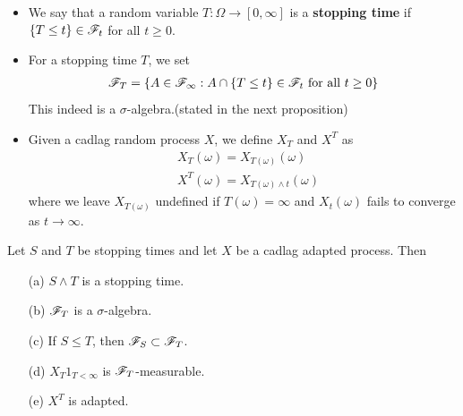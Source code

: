 \documentclass[12pt,a4paper]{report}
\begin{document}
\begin{itemize}
\item We say that a random variable $T : \Omega \rightarrow [0,\infty]$ is a \textbf{stopping time} if $\{T\leq t\} \in \mathscr{F}_t$ for all $t\geq 0$. 
\item For a stopping time $T$, we set
\begin{align*}
\mathscr{F}_T = \{A\in \mathscr{F}_{\infty} : A \cap \{T\leq t \} \in \mathscr{F}_t \text{ for all } t\geq 0 \}
\end{align*}
This indeed is a $\sigma$-algebra.(stated in the next proposition)
\item Given a cadlag random process $X$, we define $X_T$ and $X^T$ as
\begin{align*}
& X_T(\omega) = X_{T(\omega)} (\omega) \\
& X^T(\omega) = X_{T(\omega)\wedge t}(\omega)
\end{align*}
where we leave $X_{T(\omega)}$ undefined if $T(\omega) = \infty$ and $X_{t}(\omega)$ fails to converge as $t\rightarrow \infty$.
\end{itemize}
\s

 Let $S$ and $T$ be stopping times and let $X$ be a cadlag adapted process. Then
\begin{itemize}
\item[(a)] $S\wedge T$ is a stopping time.
\item[(b)] $\mathscr{F}_T$ is a $\sigma$-algebra.
\item[(c)] If $S\leq T$, then $\mathscr{F}_S \subset \mathscr{F}_T$.
\item[(d)] $X_T 1_{T<\infty}$ is $\mathscr{F}_T$-measurable.
\item[(e)] $X^T$ is adapted.
\end{itemize}
\s
\end{document}
